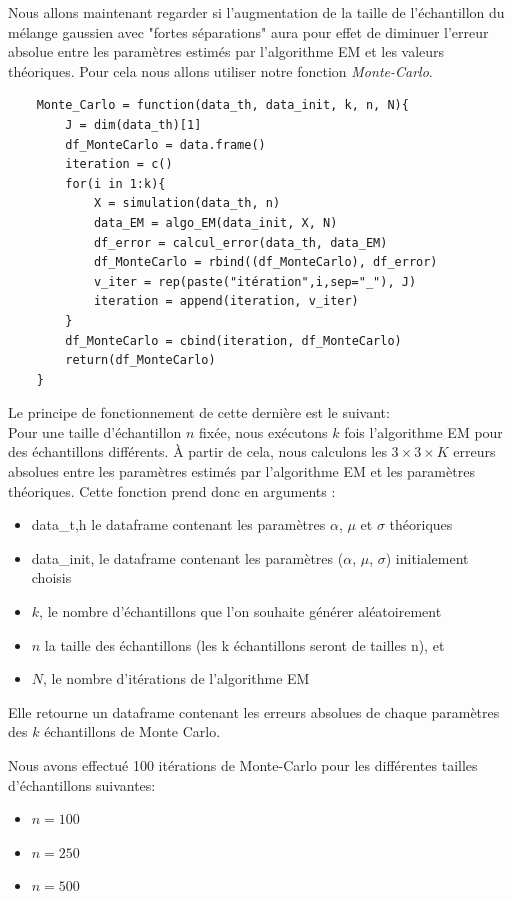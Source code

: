 \documentclass[frenchb]{report}
\newcommand{\1}{\mathbbm{1}}
\theoremstyle{definition}\newtheorem{defn}{Définition}
\theoremstyle{definition}\newtheorem{exm}{Exemple}
\theoremstyle{definition}\newtheorem{nota}{Notation}
\theoremstyle{definition}\newtheorem{rem}{Remarque}
\begin{document}
Nous allons maintenant regarder si l'augmentation de la taille de l'échantillon du mélange gaussien avec "fortes séparations" aura pour effet de diminuer l'erreur absolue entre les paramètres estimés par l'algorithme EM et les valeurs théoriques. Pour cela nous allons utiliser notre fonction \textit{Monte-Carlo}.

\begin{lstlisting}
	Monte_Carlo = function(data_th, data_init, k, n, N){
		J = dim(data_th)[1]
		df_MonteCarlo = data.frame()
		iteration = c()
		for(i in 1:k){
			X = simulation(data_th, n)
			data_EM = algo_EM(data_init, X, N)
			df_error = calcul_error(data_th, data_EM)
			df_MonteCarlo = rbind((df_MonteCarlo), df_error)
			v_iter = rep(paste("itération",i,sep="_"), J)
			iteration = append(iteration, v_iter)
		}
		df_MonteCarlo = cbind(iteration, df_MonteCarlo)
		return(df_MonteCarlo)
	}
\end{lstlisting}

Le principe de fonctionnement de cette dernière est le suivant: \\
Pour une taille d'échantillon $n$ fixée, nous exécutons $k$ fois l'algorithme EM pour des échantillons différents. À partir de cela, nous calculons les $3 \times 3 \times K$ erreurs absolues entre les paramètres estimés par l'algorithme EM et les paramètres théoriques. Cette fonction prend donc en arguments :
\begin{itemize}
	\item data\_t,h le dataframe contenant les paramètres $\alpha$, $\mu$ et $\sigma$ théoriques \\
	\item data\_init, le dataframe contenant les paramètres ($\alpha$, $\mu$, $\sigma$) initialement choisis \\
	\item $k$, le nombre d'échantillons que l'on souhaite générer aléatoirement \\
	\item $n$ la taille des échantillons (les k échantillons seront de tailles n), et \\
	\item $N$, le nombre d'itérations de l'algorithme EM
\end{itemize}

Elle retourne un dataframe contenant les erreurs absolues de chaque paramètres des $k$ échantillons de Monte Carlo.

Nous avons effectué 100 itérations de Monte-Carlo pour les différentes tailles d'échantillons suivantes:
\begin{itemize}
	\item $n = 100$ \\
	\item $n = 250$ \\
	\item $n = 500$
\end{itemize}
\end{document}
